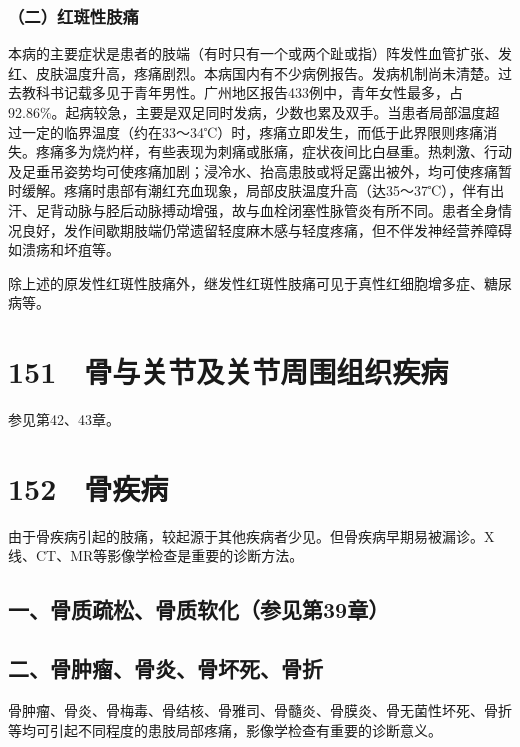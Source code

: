 \subsubsection{（二）红斑性肢痛}

本病的主要症状是患者的肢端（有时只有一个或两个趾或指）阵发性血管扩张、发红、皮肤温度升高，疼痛剧烈。本病国内有不少病例报告。发病机制尚未清楚。过去教科书记载多见于青年男性。广州地区报告433例中，青年女性最多，占92.86\%。起病较急，主要是双足同时发病，少数也累及双手。当患者局部温度超过一定的临界温度（约在33～34℃）时，疼痛立即发生，而低于此界限则疼痛消失。疼痛多为烧灼样，有些表现为刺痛或胀痛，症状夜间比白昼重。热刺激、行动及足垂吊姿势均可使疼痛加剧；浸冷水、抬高患肢或将足露出被外，均可使疼痛暂时缓解。疼痛时患部有潮红充血现象，局部皮肤温度升高（达35～37℃），伴有出汗、足背动脉与胫后动脉搏动增强，故与血栓闭塞性脉管炎有所不同。患者全身情况良好，发作间歇期肢端仍常遗留轻度麻木感与轻度疼痛，但不伴发神经营养障碍如溃疡和坏疽等。

除上述的原发性红斑性肢痛外，继发性红斑性肢痛可见于真性红细胞增多症、糖尿病等。

\protect\hypertarget{text00342.html}{}{}

\section{151　骨与关节及关节周围组织疾病}

参见第42、43章。

\protect\hypertarget{text00343.html}{}{}

\section{152　骨疾病}

由于骨疾病引起的肢痛，较起源于其他疾病者少见。但骨疾病早期易被漏诊。X线、CT、MR等影像学检查是重要的诊断方法。

\subsection{一、骨质疏松、骨质软化（参见第39章）}

\subsection{二、骨肿瘤、骨炎、骨坏死、骨折}

骨肿瘤、骨炎、骨梅毒、骨结核、骨雅司、骨髓炎、骨膜炎、骨无菌性坏死、骨折等均可引起不同程度的患肢局部疼痛，影像学检查有重要的诊断意义。

